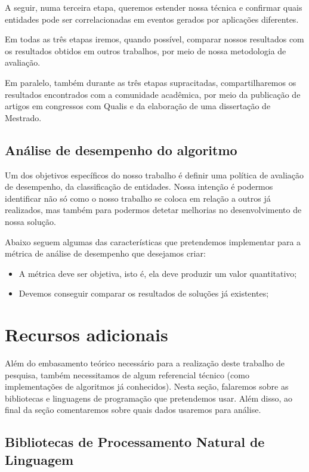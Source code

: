 \documentclass[
	12pt,				%
	openright,			%
	twoside,			%
	a4paper,			%
	english,			%
	spanish,			%
	brazil,				%
	]{abntex2}
\begin{document}
A seguir, numa terceira etapa, queremos estender nossa técnica e confirmar quais entidades pode ser correlacionadas em eventos gerados por aplicações diferentes.

Em todas as três etapas iremos, quando possível, comparar nossos resultados com os resultados obtidos em outros trabalhos, por meio de nossa metodologia de avaliação.

Em paralelo, também durante as três etapas supracitadas, compartilharemos os resultados encontrados com a comunidade acadêmica, por meio da publicação de artigos em congressos com Qualis e da elaboração de uma dissertação de Mestrado.

\subsection{Análise de desempenho do algoritmo}

Um dos objetivos específicos do nosso trabalho é definir uma política de avaliação de desempenho, da classificação de entidades. Nossa intenção é podermos identificar não só como o nosso trabalho se coloca em relação a outros já realizados, mas também para podermos detetar melhorias no desenvolvimento de nossa solução.

Abaixo seguem algumas das características que pretendemos implementar para a métrica de análise de desempenho que desejamos criar:

\begin{itemize}
	\item A métrica deve ser objetiva, isto é, ela deve produzir um valor quantitativo;
	\item Devemos conseguir comparar os resultados de soluções já existentes;
\end{itemize}

\section{Recursos adicionais}
Além do embasamento teórico necessário para a realização deste trabalho de pesquisa, também necessitamos de algum referencial técnico (como implementações de algoritmos já conhecidos). Nesta seção, falaremos sobre as bibliotecas e linguagens de programação que pretendemos usar. Além disso, ao final da seção comentaremos sobre quais dados usaremos para análise.

\subsection{Bibliotecas de Processamento Natural de Linguagem}
\end{document}
